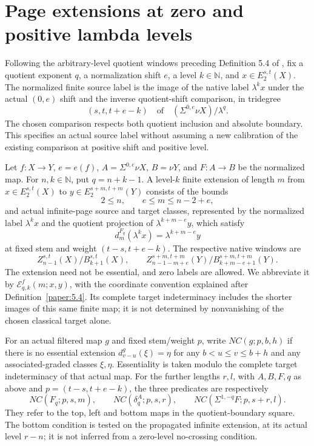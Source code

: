 \section{Page extensions at zero and positive lambda levels}

\begin{definition}
\label{sem:ProofTools:level-finite-extension}
Following the arbitrary-level quotient windows preceding Definition 5.4 of \cite{LWX126}, fix a quotient exponent $q$, a normalization shift $e$, a level $k\in\mathbb N$, and $x\in E_2^{s,t}(X)$. The normalized finite source label is the image of the native label $\lambda^k x$ under the actual $(0,e)$ shift and the inverse quotient-shift comparison, in tridegree
\[(s,t,t+e-k)\quad\text{of}\quad (\Sigma^{0,e}\nu X)/\lambda^q.\]
The chosen comparison respects both quotient inclusion and absolute boundary. This specifies an actual source label without assuming a new calibration of the existing comparison at positive shift and positive level.

Let $f:X\to Y$, $e=e(f)$, $A=\Sigma^{0,e}\nu X$, $B=\nu Y$, and $F:A\to B$ be the normalized map. For $n,k\in\mathbb N$, put $q=n+k-1$. A level-$k$ finite extension of length $m$ from $x\in E_2^{s,t}(X)$ to $y\in E_2^{s+m,t+m}(Y)$ consists of the bounds
\[2\le n,\qquad e\le m\le n-2+e,\]
and actual infinite-page source and target classes, represented by the normalized label $\lambda^k x$ and the quotient projection of $\lambda^{k+m-e}y$, which satisfy
\[d_m^{F_q}(\lambda^k x)=\lambda^{k+m-e}y\]
at fixed stem and weight $(t-s,t+e-k)$. The respective native windows are
\[Z_{n-1}^{s,t}(X)/B_{k+1}^{s,t}(X),\qquad
Z_{n-1-m+e}^{s+m,t+m}(Y)/B_{k+m-e+1}^{s+m,t+m}(Y).\]
The extension need not be essential, and zero labels are allowed.
We abbreviate it by $\mathcal E^f_{q,k}(m;x,y)$, with the coordinate
convention explained after Definition~\ref{paper:5.4}.
Its complete target indeterminacy includes the shorter images of this
same finite map; it is not determined by nonvanishing of the chosen
classical target alone.

For an actual filtered map $g$ and fixed stem/weight $p$, write $NC(g;p,b,h)$ if there is no essential extension $d_{v-u}^g(\xi)=\eta$ for any $b<u\le v\le b+h$ and any associated-graded classes $\xi,\eta$. Essentiality is taken modulo the complete target indeterminacy of that actual map. For the further lengths $r,l$, with $A,B,F,q$ as above and $p=(t-s,t+e-k)$, the three predicates are respectively
\[
NC(F_q;p,s,m),\qquad NC(\delta_q^A;p,s,r),\qquad
NC(\Sigma^{1,-q}F;p,s+r,l).
\]
They refer to the top, left and bottom maps in the quotient-boundary square. The bottom condition is tested on the propagated infinite extension, at its actual level $r-n$; it is not inferred from a zero-level no-crossing condition.
\end{definition}


